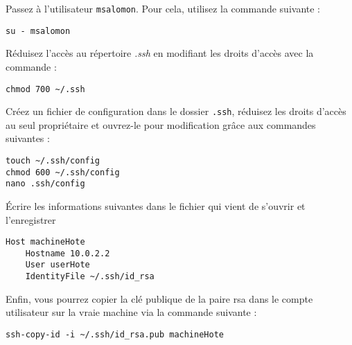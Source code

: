 Passez à l'utilisateur \texttt{msalomon}. Pour cela, utilisez la commande suivante :

\begin{lstlisting}
su - msalomon
\end{lstlisting}

Réduisez l'accès au répertoire \textit{.ssh} en modifiant les droits d'accès avec la commande :

\begin{lstlisting}
chmod 700 ~/.ssh
\end{lstlisting}

Créez un fichier de configuration dans le dossier \texttt{.ssh}, réduisez les droits d'accès au seul propriétaire et ouvrez-le pour modification grâce aux commandes suivantes :
\begin{lstlisting}
touch ~/.ssh/config
chmod 600 ~/.ssh/config
nano .ssh/config
\end{lstlisting}

Écrire les informations suivantes dans le fichier qui vient de s'ouvrir et l'enregistrer

\begin{lstlisting}[style=tf]
Host machineHote
	Hostname 10.0.2.2
	User userHote
	IdentityFile ~/.ssh/id_rsa
\end{lstlisting}

Enfin, vous pourrez copier la clé publique de la paire rsa dans le compte utilisateur sur la vraie machine via la commande suivante :

\begin{lstlisting}
ssh-copy-id -i ~/.ssh/id_rsa.pub machineHote
\end{lstlisting}
